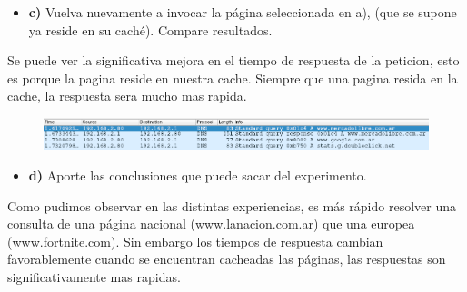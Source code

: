 \documentclass[12pt]{extarticle}
\providecommand{\tightlist}{%
      \setlength{\itemsep}{0pt}\setlength{\parskip}{0pt}}
\begin{document}
\begin{itemize}
\tightlist
\item
  \textbf{c)} Vuelva nuevamente a invocar la página seleccionada en a),
  (que se supone ya reside en su caché). Compare resultados.
\end{itemize}

Se puede ver la significativa mejora en el tiempo de respuesta de la
peticion, esto es porque la pagina reside en nuestra cache. Siempre que
una pagina resida en la cache, la respuesta sera mucho mas rapida.

\begin{figure}[h]
\centering
\includegraphics{images/cacheada.png}
\caption{}
\end{figure}

\begin{itemize}
\tightlist
\item
  \textbf{d)} Aporte las conclusiones que puede sacar del experimento.
\end{itemize}

Como pudimos observar en las distintas experiencias, es más rápido
resolver una consulta de una página nacional (www.lanacion.com.ar) que
una europea (www.fortnite.com). Sin embargo los tiempos de respuesta
cambian favorablemente cuando se encuentran cacheadas las páginas, las
respuestas son significativamente mas rapidas.


    
    



    
    
\end{document}
